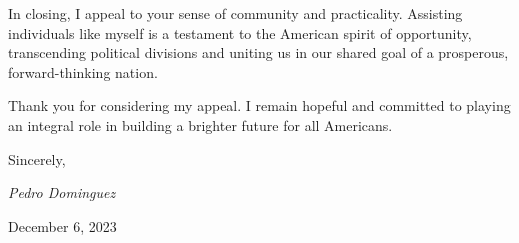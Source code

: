 \documentclass[12pt]{article}
\begin{document}
In closing, I appeal to your sense of community and practicality. Assisting individuals like myself is a testament to the American spirit of opportunity, transcending political divisions and uniting us in our shared goal of a prosperous, forward-thinking nation.

Thank you for considering my appeal. I remain hopeful and committed to playing an integral role in building a brighter future for all Americans.

\vspace{2em}

Sincerely,

\vspace{2em}

\hfill \textit{\large Pedro Dominguez} %

\hfill December 6, 2023
\end{document}
